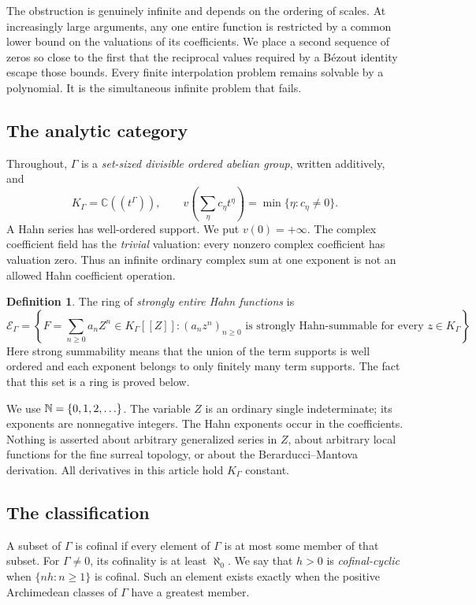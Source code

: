 \documentclass[11pt]{article}
\theoremstyle{plain}
\theoremstyle{plain}
\theoremstyle{plain}
\theoremstyle{definition}
\newtheorem{definition}[definition]{Definition}
\theoremstyle{definition}
\theoremstyle{definition}
\theoremstyle{remark}
\newcommand{\C}{\mathbb C}\newcommand{\R}{\mathbb R}
\newcommand{\K}{K_\Gamma}\newcommand{\E}{\mathcal E_\Gamma}
\begin{document}
The obstruction is genuinely infinite and depends on the ordering of
scales. At increasingly large arguments, any one entire function is
restricted by a common lower bound on the valuations of its coefficients.
We place a second sequence of zeros so close to the first that the
reciprocal values required by a B\'ezout identity escape those bounds.
Every finite interpolation problem remains solvable by a polynomial.
It is the simultaneous infinite problem that fails.

\subsection{The analytic category}
Throughout, $\Gamma$ is a \emph{set-sized divisible ordered abelian group},
written additively, and
\[
 \K=\C((t^\Gamma)),\qquad
 v\left(\sum_\eta c_\eta t^\eta\right)=\min\{\eta:c_\eta\ne0\}.
\]
A Hahn series has well-ordered support. We put $v(0)=+\infty$.
The complex coefficient field has the \emph{trivial} valuation: every
nonzero complex coefficient has valuation zero. Thus an infinite ordinary
complex sum at one exponent is not an allowed Hahn coefficient operation.

\begin{definition}\label{def:entire}
The ring of \emph{strongly entire Hahn functions} is
\[
 \E=\left\{F=\sum_{n\ge0}a_nZ^n\in\K[[Z]]:
       (a_nz^n)_{n\ge0}\text{ is strongly Hahn-summable for every }z\in\K
       \right\}.
\]
Here strong summability means that the union of the term supports is
well ordered and each exponent belongs to only finitely many term
supports. The fact that this set is a ring is proved below.
\end{definition}

We use $\mathbb N=\{0,1,2,\ldots\}$. The variable $Z$ is an ordinary single indeterminate; its exponents are
nonnegative integers. The Hahn exponents occur in the coefficients.
Nothing is asserted about arbitrary generalized series in $Z$, about
arbitrary local functions for the fine surreal topology, or about the
Berarducci--Mantova derivation. All derivatives in this article hold
$\K$ constant.

\subsection{The classification}
A subset of $\Gamma$ is cofinal if every element of $\Gamma$ is at most
some member of that subset. For $\Gamma\ne0$, its cofinality is at least
$\aleph_0$. We say that $h>0$ is \emph{cofinal-cyclic} when
$\{nh:n\ge1\}$ is cofinal. Such an element exists exactly when the positive
Archimedean classes of $\Gamma$ have a greatest member.
\end{document}
